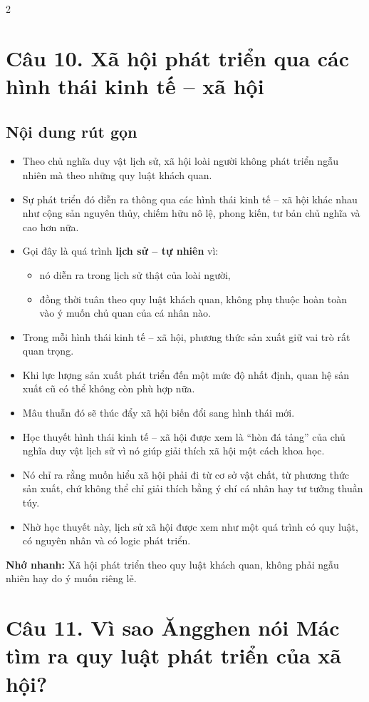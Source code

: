 \documentclass[9pt,a4paper]{extarticle}
\begin{document}
\begin{multicols*}{2}
\section*{Câu 10. Xã hội phát triển qua các hình thái kinh tế -- xã hội}
\subsection*{Nội dung rút gọn}
\begin{itemize}
  \item Theo chủ nghĩa duy vật lịch sử, xã hội loài người không phát triển ngẫu nhiên mà theo những quy luật khách quan.
  \item Sự phát triển đó diễn ra thông qua các hình thái kinh tế -- xã hội khác nhau như cộng sản nguyên thủy, chiếm hữu nô lệ, phong kiến, tư bản chủ nghĩa và cao hơn nữa.
  \item Gọi đây là quá trình \textbf{lịch sử -- tự nhiên} vì:
  \begin{itemize}
    \item nó diễn ra trong lịch sử thật của loài người,
    \item đồng thời tuân theo quy luật khách quan, không phụ thuộc hoàn toàn vào ý muốn chủ quan của cá nhân nào.
  \end{itemize}
  \item Trong mỗi hình thái kinh tế -- xã hội, phương thức sản xuất giữ vai trò rất quan trọng.
  \item Khi lực lượng sản xuất phát triển đến một mức độ nhất định, quan hệ sản xuất cũ có thể không còn phù hợp nữa.
  \item Mâu thuẫn đó sẽ thúc đẩy xã hội biến đổi sang hình thái mới.
  \item Học thuyết hình thái kinh tế -- xã hội được xem là ``hòn đá tảng'' của chủ nghĩa duy vật lịch sử vì nó giúp giải thích xã hội một cách khoa học.
  \item Nó chỉ ra rằng muốn hiểu xã hội phải đi từ cơ sở vật chất, từ phương thức sản xuất, chứ không thể chỉ giải thích bằng ý chí cá nhân hay tư tưởng thuần túy.
  \item Nhờ học thuyết này, lịch sử xã hội được xem như một quá trình có quy luật, có nguyên nhân và có logic phát triển.
\end{itemize}

\textbf{Nhớ nhanh:} Xã hội phát triển theo quy luật khách quan, không phải ngẫu nhiên hay do ý muốn riêng lẻ.

\section*{Câu 11. Vì sao Ăngghen nói Mác tìm ra quy luật phát triển của xã hội?}

\end{multicols*}
\end{document}
